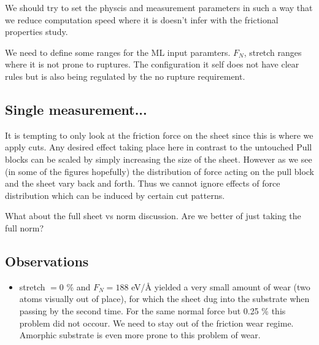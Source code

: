 We should try to set the physcis and measurement parameters in such a way that we reduce computation speed where it is doesn't infer with the frictional properties study.

We need to define some ranges for the ML input paramters. $F_N$, stretch ranges where it is not prone to ruptures. The configuration it self does not have clear rules but is also being regulated by the no rupture requirement. 



\subsection{Single measurement...}

It is tempting to only look at the friction force on the sheet since this is where we apply cuts. Any desired effect taking place here in contrast to the untouched Pull blocks can be scaled by simply increasing the size of the sheet. However as we see (in some of the figures hopefully) the distribution of force acting on the pull block and the sheet vary back and forth. Thus we cannot ignore effects of force distribution which can be induced by certain cut patterns. 

What about the full sheet vs norm discussion. Are we better of just taking the full norm?



\subsection*{Observations}






\begin{itemize}
  \item stretch $= 0$ \% and $F_N = 188$ eV/Å yielded a very small amount of wear (two atoms visually out of place), for which the sheet dug into the substrate when passing by the second time. For the same normal force but 0.25 \% this problem did not occour. We need to stay out of the friction wear regime. Amorphic substrate is even more prone to this problem of wear.
\end{itemize}